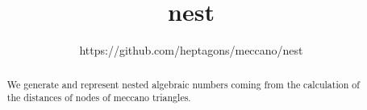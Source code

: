 \documentclass[11pt]{article}
\title{nest}
\author{https://github.com/heptagons/meccano/nest}
\date{}
\begin{document}
\maketitle
\begin{abstract}
We generate and represent nested algebraic numbers coming from the
calculation of the distances of nodes of meccano triangles.
\end{abstract}
\end{document}
